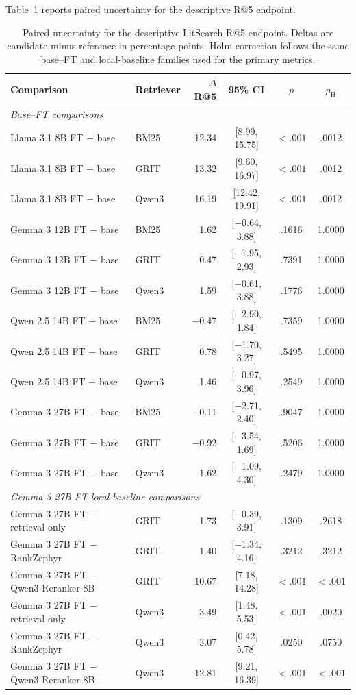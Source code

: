 \documentclass[pdflatex,sn-basic,Numbered]{sn-jnl}%
\theoremstyle{thmstyleone}%
\theoremstyle{thmstyletwo}%
\theoremstyle{thmstylethree}%
\begin{document}
Table~\ref{tab:litsearch-r5-uncertainty} reports paired uncertainty for the descriptive R@5 endpoint.

\begin{table}[htbp]


\centering
\scriptsize
\setlength{\tabcolsep}{4pt}
\renewcommand{\arraystretch}{0.98}
\begin{tabularx}{\textwidth}{X l r c c c}
\hline
Comparison & Retriever & $\Delta$R@5 & 95\% CI & $p$ & $p_{\mathrm{H}}$ \\
\hline
\multicolumn{6}{l}{\textit{Base--FT comparisons}} \\
Llama 3.1 8B FT $-$ base & BM25 & 12.34 & [8.99, 15.75] & $<.001$ & .0012 \\
Llama 3.1 8B FT $-$ base & GRIT & 13.32 & [9.60, 16.97] & $<.001$ & .0012 \\
Llama 3.1 8B FT $-$ base & Qwen3 & 16.19 & [12.42, 19.91] & $<.001$ & .0012 \\
Gemma 3 12B FT $-$ base & BM25 & 1.62 & [$-$0.64, 3.88] & .1616 & 1.0000 \\
Gemma 3 12B FT $-$ base & GRIT & 0.47 & [$-$1.95, 2.93] & .7391 & 1.0000 \\
Gemma 3 12B FT $-$ base & Qwen3 & 1.59 & [$-$0.61, 3.88] & .1776 & 1.0000 \\
Qwen 2.5 14B FT $-$ base & BM25 & $-$0.47 & [$-$2.90, 1.84] & .7359 & 1.0000 \\
Qwen 2.5 14B FT $-$ base & GRIT & 0.78 & [$-$1.70, 3.27] & .5495 & 1.0000 \\
Qwen 2.5 14B FT $-$ base & Qwen3 & 1.46 & [$-$0.97, 3.96] & .2549 & 1.0000 \\
Gemma 3 27B FT $-$ base & BM25 & $-$0.11 & [$-$2.71, 2.40] & .9047 & 1.0000 \\
Gemma 3 27B FT $-$ base & GRIT & $-$0.92 & [$-$3.54, 1.69] & .5206 & 1.0000 \\
Gemma 3 27B FT $-$ base & Qwen3 & 1.62 & [$-$1.09, 4.30] & .2479 & 1.0000 \\
\hline
\multicolumn{6}{l}{\textit{Gemma 3 27B FT local-baseline comparisons}} \\
Gemma 3 27B FT $-$ retrieval only & GRIT & 1.73 & [$-$0.39, 3.91] & .1309 & .2618 \\
Gemma 3 27B FT $-$ RankZephyr & GRIT & 1.40 & [$-$1.34, 4.16] & .3212 & .3212 \\
Gemma 3 27B FT $-$ Qwen3-Reranker-8B & GRIT & 10.67 & [7.18, 14.28] & $<.001$ & $<.001$ \\
Gemma 3 27B FT $-$ retrieval only & Qwen3 & 3.49 & [1.48, 5.53] & $<.001$ & .0020 \\
Gemma 3 27B FT $-$ RankZephyr & Qwen3 & 3.07 & [0.42, 5.78] & .0250 & .0750 \\
Gemma 3 27B FT $-$ Qwen3-Reranker-8B & Qwen3 & 12.81 & [9.21, 16.39] & $<.001$ & $<.001$ \\
\hline
\end{tabularx}


\caption{Paired uncertainty for the descriptive LitSearch R@5 endpoint. Deltas
are candidate minus reference in percentage points. Holm correction follows the
same base--FT and local-baseline families used for the primary metrics.}
\label{tab:litsearch-r5-uncertainty}
\end{table}
\end{document}
